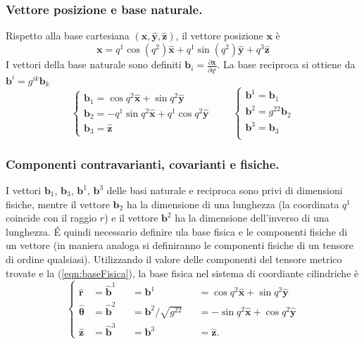 \subsubsection{Vettore posizione e base naturale.}
Rispetto alla base cartesiana $(\bm{\hat{x}},\bm{\hat{y}},\bm{\hat{z}})$, il vettore posizione $\bm{x}$ è
\begin{equation}
 \bm{x} = q^1 \cos(q^2) \bm{\hat{x}} + q^1 \sin(q^2) \bm{\hat{y}} + q^3  \bm{\hat{z}}
\end{equation}
I vettori della base naturale sono definiti $\bm{b}_i = \frac{\partial \bm{x}}{\partial q^i}$. La base 
 reciproca si ottiene da $\bm{b}^i = g^{ik}\bm{b}_k$
\begin{equation}
 \begin{cases}
   \bm{b}_1 =      \cos q^2 \bm{\hat{x}} +     \sin q^2 \bm{\hat{y}} \\
   \bm{b}_2 = -q^1 \sin q^2 \bm{\hat{x}} + q^1 \cos q^2 \bm{\hat{y}} \\
   \bm{b}_3 = \bm{\hat{z}}
 \end{cases}
 \qquad
 \begin{cases}
   \bm{b}^1 = \bm{b}_1 \\ \bm{b}^2 = g^{22} \bm{b}_2 \\ \bm{b}^3 = \bm{b}_3 \\
 \end{cases}
\end{equation}

\subsubsection{Componenti contravarianti, covarianti e fisiche.}
 I vettori $\bm{b}_1$, $\bm{b}_3$, $\bm{b}^1$, $\bm{b}^3$ delle basi naturale e reciproca sono privi di dimensioni fisiche, mentre il vettore $\bm{b}_2$ ha la dimensione di una lunghezza (la coordinata $q^1$ coincide con il raggio $r$) e il vettore $\bm{b}^2$ ha la dimensione dell'inverso di 
 una lunghezza. \'E quindi necessario definire ula base fisica e le componenti fisiche di un vettore (in maniera analoga si definiranno le componenti fisiche di un tensore di ordine qualsiasi).
 Utilizzando il valore delle componenti del tensore metrico trovate e la (\ref{eqn:baseFisica}), la base fisica nel sistema di coordiante cilindriche è
 \begin{equation}
 \left\{
 \begin{aligned}
  \bm{\hat{r}}     & = \bm{\hat{b}}^1 && = \bm{b}^1                 && =  \cos q^2 \bm{\hat{x}} +     \sin q^2 \bm{\hat{y}} \\
  \bm{\hat{\theta}}& = \bm{\hat{b}}^2 && = \bm{b}^2/{\sqrt{g^{22}}} && = -\sin q^2 \bm{\hat{x}} +     \cos q^2 \bm{\hat{y}} \\
  \bm{\hat{z}}     & = \bm{\hat{b}}^3 && = \bm{b}^3                 && =  \bm{\hat{z}} .
 \end{aligned}
 \right.
 \end{equation}

